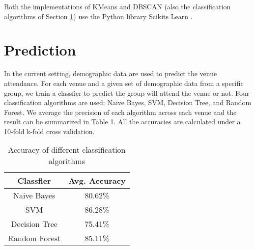 \documentclass[12pt]{article}
\begin{document}
Both the implementations of KMeans and DBSCAN (also the classification algorithms of Section \ref{prediction}) use the Python library Scikits Learn \cite{sklearn}.

\section{Prediction}\label{prediction}

In the current setting, demographic data are used to predict the venue attendance. For each venue and a given set of demographic data from a specific group, we train a classfier to predict the group will attend the venue or not. Four classification algorithms are used: Naive Bayes, SVM, Decision Tree, and Random Forest. We average the precision of each algorithm across each venue and the result can be summarized in Table \ref{class-accu}. All the accuracies are calculated under a 10-fold k-fold cross validation.

\begin{table}
\begin{center}
    \begin{tabular}{ | c | c | }
        \hline
        \textbf {Classfier} & \textbf{Avg. Accuracy} \\ \hline
        \hline
        Naive Bayes     & 80.62\% \\ \hline
        SVM             & 86.28\% \\ \hline
        Decision Tree   & 75.41\% \\ \hline
        Random Forest   & 85.11\% \\ \hline
    \end{tabular}
\caption{Accuracy of different classification algorithms}
\label{class-accu}
\end{center}
\end{table}
\end{document}
